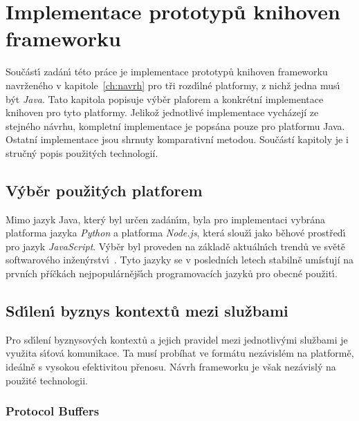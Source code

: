 

\chapter{Implementace prototypů knihoven frameworku}\label{ch:implementace}

Součást\'{\i} zadán\'{\i} této práce je implementace prototypů
knihoven frameworku navrženého v kapitole~\ref{ch:navrh}
pro tři rozd\'{\i}lné platformy, z nichž jedna mus\'{\i} b\'yt \textit{Java}.
Tato kapitola popisuje výběr plaforem a konkrétní implementace
knihoven pro tyto platformy. Jelikož jednotlivé implementace
vycházejí ze stejného návrhu, kompletní implementace
je popsána pouze pro platformu Java. Ostatní implementace jsou
shrnuty komparativní metodou. Součástí kapitoly je i stručný popis
použitých technologií.

\section{V\'yběr použit\'ych platforem}

Mimo jazyk Java, kter\'y byl určen zadán\'{\i}m, byla pro
implementaci vybrána platforma jazyka \textit{Python} a platforma \textit{Node.js},
která slouž\'{\i} jako běhové prostřed\'{\i} pro jazyk \textit{JavaScript}.
V\'yběr byl proveden na základě aktuáln\'{\i}ch trendů ve světě softwarového
inžen\'yrstv\'{\i}~\cite{githut}\cite{octoverse}\cite{stackoverflowsurvey}.
Tyto jazyky se v posledních letech stabilně umísťují na prvních příčkách
nejpopulárnějš\'{\i}ch programovacích jazyků pro obecné použit\'{\i}.

\section{Sd\'{\i}len\'{\i} byznys kontextů mezi službami}

Pro sd\'{\i}lení byznysových kontextů a jejich pravidel
mezi jednotliv\'ymi službami je využita s\'{\i}ťová komunikace.
Ta musí probíhat ve formátu nezávislém na platformě, ideálně s vysokou
efektivitou přenosu. Návrh frameworku je však nezávislý na použité technologii.

\subsection{Protocol Buffers}

